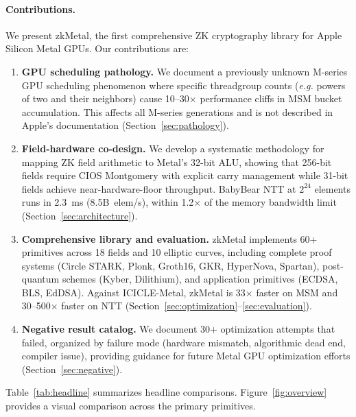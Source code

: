 \documentclass[letterpaper,twocolumn,10pt]{article}
\newcommand{\sys}{zkMetal\xspace}
\newcommand{\eg}{\textit{e.g.}\xspace}
\begin{document}
\paragraph{Contributions.} We present \sys, the first comprehensive
ZK cryptography library for Apple Silicon Metal GPUs. Our contributions are:

\begin{enumerate}
\item \textbf{GPU scheduling pathology.} We document a previously unknown
  M-series GPU scheduling phenomenon where specific threadgroup counts
  (\eg powers of two and their neighbors) cause 10--30$\times$
  performance cliffs in MSM bucket accumulation. This affects all M-series
  generations and is not described in Apple's documentation
  (Section~\ref{sec:pathology}).

\item \textbf{Field-hardware co-design.} We develop a systematic
  methodology for mapping ZK field arithmetic to Metal's 32-bit ALU,
  showing that 256-bit fields require CIOS Montgomery with explicit carry
  management while 31-bit fields achieve near-hardware-floor throughput.
  BabyBear NTT at $2^{24}$ elements runs in 2.3~ms (8.5B~elem/s), within
  1.2$\times$ of the memory bandwidth limit
  (Section~\ref{sec:architecture}).

\item \textbf{Comprehensive library and evaluation.} \sys implements 60+
  primitives across 18 fields and 10 elliptic curves, including complete
  proof systems (Circle STARK, Plonk, Groth16, GKR, HyperNova, Spartan),
  post-quantum schemes (Kyber, Dilithium), and application primitives
  (ECDSA, BLS, EdDSA). Against ICICLE-Metal, \sys is 33$\times$ faster on
  MSM and 30--500$\times$ faster on NTT
  (Section~\ref{sec:optimization}--\ref{sec:evaluation}).

\item \textbf{Negative result catalog.} We document 30+ optimization
  attempts that failed, organized by failure mode (hardware mismatch,
  algorithmic dead end, compiler issue), providing guidance for future Metal
  GPU optimization efforts (Section~\ref{sec:negative}).
\end{enumerate}

Table~\ref{tab:headline} summarizes headline comparisons.
Figure~\ref{fig:overview} provides a visual comparison across the primary
primitives.
\end{document}
